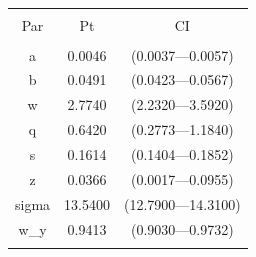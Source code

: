 
\begin{table}[!htbp] \centering 
  \caption{} 
  \label{} 
\begin{tabular}{@{\extracolsep{5pt}} ccc} 
\\[-1.8ex]\hline 
\hline \\[-1.8ex] 
Par & Pt & CI \\ 
\hline \\[-1.8ex] 
a & 0.0046 & (0.0037---0.0057) \\ 
b & 0.0491 & (0.0423---0.0567) \\ 
w & 2.7740 & (2.2320---3.5920) \\ 
q & 0.6420 & (0.2773---1.1840) \\ 
s & 0.1614 & (0.1404---0.1852) \\ 
z & 0.0366 & (0.0017---0.0955) \\ 
sigma & 13.5400 & (12.7900---14.3100) \\ 
w\_y & 0.9413 & (0.9030---0.9732) \\ 
\hline \\[-1.8ex] 
\end{tabular} 
\end{table} 
